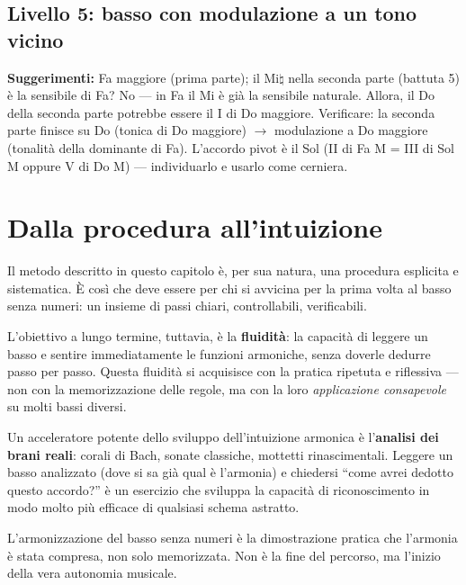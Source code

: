 \subsection{Livello 5: basso con modulazione a un tono vicino}


\textbf{Suggerimenti:} Fa maggiore (prima parte); il Mi$\natural$ nella seconda parte (battuta 5) è la sensibile di Fa? No --- in Fa il Mi è già la sensibile naturale. Allora, il Do della seconda parte potrebbe essere il I di Do maggiore. Verificare: la seconda parte finisce su Do (tonica di Do maggiore) $\rightarrow$ modulazione a Do maggiore (tonalità della dominante di Fa). L'accordo pivot è il Sol (II di Fa M = III di Sol M oppure V di Do M) --- individuarlo e usarlo come cerniera.

\section{Dalla procedura all'intuizione}
\label{sec:dall_procedura_intuizione}

Il metodo descritto in questo capitolo è, per sua natura, una procedura esplicita e sistematica. È così che deve essere per chi si avvicina per la prima volta al basso senza numeri: un insieme di passi chiari, controllabili, verificabili.

L'obiettivo a lungo termine, tuttavia, è la \textbf{fluidità}: la capacità di leggere un basso e sentire immediatamente le funzioni armoniche, senza doverle dedurre passo per passo. Questa fluidità si acquisisce con la pratica ripetuta e riflessiva --- non con la memorizzazione delle regole, ma con la loro \textit{applicazione consapevole} su molti bassi diversi.

\begin{osservazione}
	\label{oss:analisi_brani}
	Un acceleratore potente dello sviluppo dell'intuizione armonica è l'\textbf{analisi dei brani reali}: corali di Bach, sonate classiche, mottetti rinascimentali. Leggere un basso analizzato (dove si sa già qual è l'armonia) e chiedersi ``come avrei dedotto questo accordo?'' è un esercizio che sviluppa la capacità di riconoscimento in modo molto più efficace di qualsiasi schema astratto.
\end{osservazione}

L'armonizzazione del basso senza numeri è la dimostrazione pratica che l'armonia è stata compresa, non solo memorizzata. Non è la fine del percorso, ma l'inizio della vera autonomia musicale.
